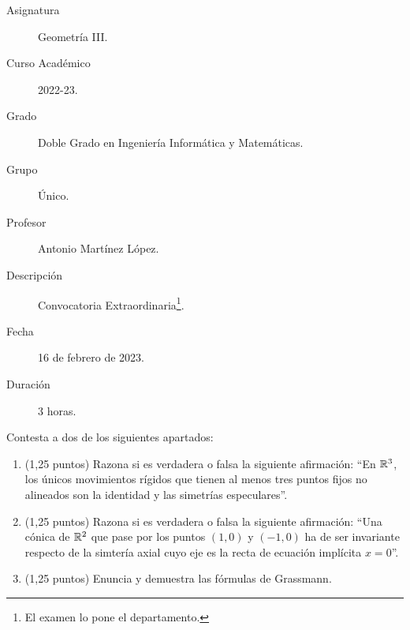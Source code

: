 \documentclass[12pt]{article}
\begin{document}

    
    

    
    \begin{description}
        \item[Asignatura] Geometría III.
        \item[Curso Académico] 2022-23.
        \item[Grado] Doble Grado en Ingeniería Informática y Matemáticas.
        \item[Grupo] Único.
        \item[Profesor] Antonio Martínez López.
        \item[Descripción] Convocatoria Extraordinaria\footnote{El examen lo pone el departamento.}.
        \item[Fecha] 16 de febrero de 2023.
        \item[Duración] 3 horas.
    
    \end{description}
    \newpage

    \begin{ejercicio}[2,5 puntos]
        Contesta a dos de los siguientes apartados:
        \begin{enumerate}
            \item (1,25 puntos) Razona si es verdadera o falsa la siguiente afirmación: ``En $\mathbb{R}^3$, los únicos movimientos rígidos que tienen al menos tres puntos fijos no alineados son la identidad y las simetrías especulares''.
            \item (1,25 puntos) Razona si es verdadera o falsa la siguiente afirmación: ``Una cónica de $\mathbb{R}^2$ que pase por los puntos $(1,0)$ y $(-1,0)$ ha de ser invariante respecto de la simtería axial cuyo eje es la recta de ecuación implícita $x=0$''.
            \item (1,25 puntos) Enuncia y demuestra las fórmulas de Grassmann.
        \end{enumerate}
    \end{ejercicio}
\end{document}
